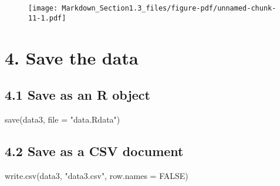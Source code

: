 \documentclass[
  letterpaper,
  DIV=11,
  numbers=noendperiod]{scrreprt}
\newenvironment{Shaded}{\begin{snugshade}}{\end{snugshade}}
\newcommand{\AttributeTok}[1]{\textcolor[rgb]{0.40,0.45,0.13}{#1}}
\newcommand{\ConstantTok}[1]{\textcolor[rgb]{0.56,0.35,0.01}{#1}}
\newcommand{\FunctionTok}[1]{\textcolor[rgb]{0.28,0.35,0.67}{#1}}
\newcommand{\NormalTok}[1]{\textcolor[rgb]{0.00,0.23,0.31}{#1}}
\newcommand{\SpecialCharTok}[1]{\textcolor[rgb]{0.37,0.37,0.37}{#1}}
\newcommand{\StringTok}[1]{\textcolor[rgb]{0.13,0.47,0.30}{#1}}
\begin{document}
\begin{Shaded}
\end{Shaded}

\begin{figure}[H]

{\centering \texttt{[image: Markdown\_Section1.3\_files/figure-pdf/unnamed-chunk-11-1.pdf]}

}

\end{figure}

\hypertarget{save-the-data}{%
\chapter{4. Save the data}\label{save-the-data}}

\hypertarget{save-as-an-r-object}{%
\section{4.1 Save as an R object}\label{save-as-an-r-object}}

\begin{Shaded}
\begin{Highlighting}[]
\FunctionTok{save}\NormalTok{(data3, }\AttributeTok{file =} \StringTok{"data.Rdata"}\NormalTok{)}
\end{Highlighting}
\end{Shaded}

\hypertarget{save-as-a-csv-document}{%
\section{4.2 Save as a CSV document}\label{save-as-a-csv-document}}

\begin{Shaded}
\begin{Highlighting}[]
\FunctionTok{write.csv}\NormalTok{(data3, }\StringTok{"data3.csv"}\NormalTok{, }\AttributeTok{row.names =} \ConstantTok{FALSE}\NormalTok{)}
\end{Highlighting}
\end{Shaded}
\end{document}
